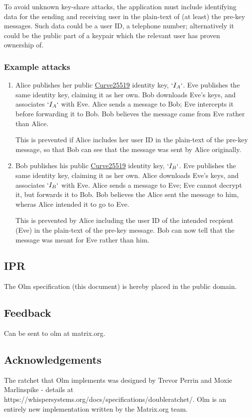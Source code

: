 \documentclass[10pt]{article}
\begin{document}
To avoid unknown key-share attacks, the application must include
identifying data for the sending and receiving user in the plain-text of
(at least) the pre-key messages. Such data could be a user ID, a
telephone number; alternatively it could be the public part of a keypair
which the relevant user has proven ownership of.

\subsubsection{Example attacks}\label{example-attacks}

\begin{enumerate}
\def\labelenumi{\arabic{enumi}.}
\item
  Alice publishes her public
  \href{http://cr.yp.to/ecdh.html}{Curve25519} identity key, \(`I_A`\).
  Eve publishes the same identity key, claiming it as her own. Bob
  downloads Eve's keys, and associates \(`I_A`\) with Eve. Alice sends a
  message to Bob; Eve intercepts it before forwarding it to Bob. Bob
  believes the message came from Eve rather than Alice.

  This is prevented if Alice includes her user ID in the plain-text of
  the pre-key message, so that Bob can see that the message was sent by
  Alice originally.
\item
  Bob publishes his public \href{http://cr.yp.to/ecdh.html}{Curve25519}
  identity key, \(`I_B`\). Eve publishes the same identity key, claiming
  it as her own. Alice downloads Eve's keys, and associates \(`I_B`\)
  with Eve. Alice sends a message to Eve; Eve cannot decrypt it, but
  forwards it to Bob. Bob believes the Alice sent the message to him,
  wheras Alice intended it to go to Eve.

  This is prevented by Alice including the user ID of the intended
  recpient (Eve) in the plain-text of the pre-key message. Bob can now
  tell that the message was meant for Eve rather than him.
\end{enumerate}

\subsection{IPR}\label{ipr}

The Olm specification (this document) is hereby placed in the public
domain.

\subsection{Feedback}\label{feedback}

Can be sent to olm at matrix.org.

\subsection{Acknowledgements}\label{acknowledgements}

The ratchet that Olm implements was designed by Trevor Perrin and Moxie
Marlinspike - details at
https://whispersystems.org/docs/specifications/doubleratchet/. Olm is an
entirely new implementation written by the Matrix.org team.
\end{document}
